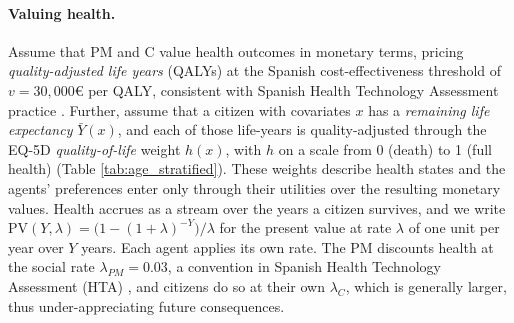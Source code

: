 \documentclass[12pt]{article}
\begin{document}
\paragraph{Valuing health.} Assume that PM and C value health outcomes in monetary terms, pricing \emph{quality-adjusted life years} (QALYs) at the Spanish cost-effectiveness threshold of $v = 30{,}000$€ per QALY, consistent with Spanish Health Technology Assessment practice \citep{vallejo2018estimating, sacristan2002que}. Further, assume that a citizen with covariates $x$ has a \emph{remaining life expectancy} $\bar{Y}(x)$, and each of those life-years is quality-adjusted through the EQ-5D \emph{quality-of-life} weight $h(x)$, with $h$ on a scale from 0 (death) to 1 (full health) \citep{garcia2016normative} (Table \ref{tab:age_stratified}). These weights describe health states and the agents' preferences enter only through their utilities over the resulting monetary values. Health accrues as a stream over the years a citizen survives, and we write $\mathrm{PV}(Y,\lambda) = \big(1-(1+\lambda)^{-Y}\big)/\lambda$ for the present value at rate $\lambda$ of one unit per year over $Y$ years. Each agent applies its own rate. The PM discounts health at the social rate $\lambda_{PM} = 0.03$, a convention in Spanish Health Technology Assessment (HTA) \citep{lopez2010spanish}, and citizens do so at their own $\lambda_C$, which is generally larger, thus under-appreciating future consequences.
\end{document}
